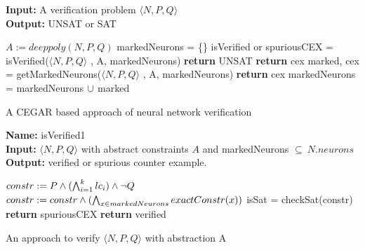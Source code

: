 \begin{algorithm}[t]
  \textbf{Input: } A verification problem $\langle N,P,Q \rangle$ \\
  \textbf{Output: } UNSAT or SAT
  \begin{algorithmic}[1]
    \State $A := deeppoly(N,P,Q)$
    \State markedNeurons = \{\}
      \State isVerified or spuriousCEX = isVerified($\langle N,P,Q \rangle$ , A, markedNeurons)
        \State \textbf{return} UNSAT
      \Else
          \State \textbf{return} cex
        \Else
          \State marked, cex = getMarkedNeurons($\langle N,P,Q \rangle$ , A, markedNeurons)
            \State \textbf{return} cex
          \EndIf
          \State markedNeurons = markedNeurons ${\cup}$ marked
        \EndIf
      \EndIf
    \EndWhile
  \end{algorithmic}
  \caption{A CEGAR based approach of neural network verification}
  \label{algo:main}
\end{algorithm}

\begin{algorithm}[t]
  \textbf{Name: } isVerified1 \\
  \textbf{Input: } $\langle N,P,Q \rangle$ with abstract constraints $A$ and markedNeurons $\subseteq ~ N.neurons$ \\
  \textbf{Output: } verified or spurious counter example. 
  \begin{algorithmic}[1]
    \State $constr := P \land (\bigwedge_{i=1}^k lc_i)\land \neg Q$
    \State $constr := constr \land (\bigwedge_{x \in markedNeurons} exactConstr(x))$ 
    \State isSat = checkSat(constr)
      \State \textbf{return} spuriousCEX
    \Else
      \State \textbf{return} verified
    \EndIf
  \end{algorithmic}
  \caption{An approach to verify $\langle N,P,Q \rangle$ with abstraction A}
  \label{algo:verif1}
\end{algorithm}

